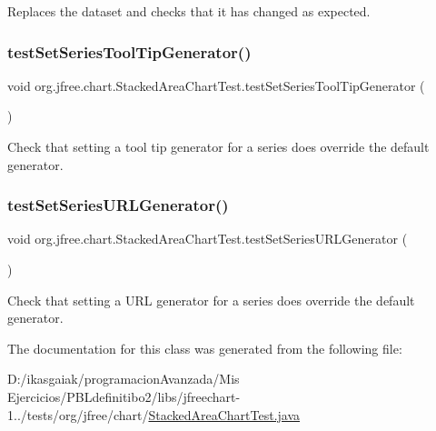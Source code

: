 Replaces the dataset and checks that it has changed as expected. \mbox{\label{classorg_1_1jfree_1_1chart_1_1_stacked_area_chart_test_aa24c4a3f61f9ebb9af056651811b5164}} 
\subsubsection{\texorpdfstring{test\+Set\+Series\+Tool\+Tip\+Generator()}{testSetSeriesToolTipGenerator()}}
{\footnotesize\ttfamily void org.\+jfree.\+chart.\+Stacked\+Area\+Chart\+Test.\+test\+Set\+Series\+Tool\+Tip\+Generator (\begin{DoxyParamCaption}{ }\end{DoxyParamCaption})}

Check that setting a tool tip generator for a series does override the default generator. \mbox{\label{classorg_1_1jfree_1_1chart_1_1_stacked_area_chart_test_a2fbced4a83a7235c60f71eda447207d9}} 
\subsubsection{\texorpdfstring{test\+Set\+Series\+U\+R\+L\+Generator()}{testSetSeriesURLGenerator()}}
{\footnotesize\ttfamily void org.\+jfree.\+chart.\+Stacked\+Area\+Chart\+Test.\+test\+Set\+Series\+U\+R\+L\+Generator (\begin{DoxyParamCaption}{ }\end{DoxyParamCaption})}

Check that setting a U\+RL generator for a series does override the default generator. 

The documentation for this class was generated from the following file\+:\begin{DoxyCompactItemize}
\item 
D\+:/ikasgaiak/programacion\+Avanzada/\+Mis Ejercicios/\+P\+B\+Ldefinitibo2/libs/jfreechart-\/1../tests/org/jfree/chart/\mbox{\hyperlink{_stacked_area_chart_test_8java}{Stacked\+Area\+Chart\+Test.\+java}}\end{DoxyCompactItemize}
